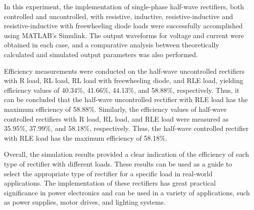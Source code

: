 \hspace{\parindent}

In this experiment, the implementation of single-phase half-wave rectifiers, both controlled and uncontrolled, with resistive, inductive, resistive-inductive and resistive-inductive with freewheeling diode loads were successfully accomplished using MATLAB's Simulink. The output waveforms for voltage and current were obtained in each case, and a comparative analysis between theoretically calculated and simulated output parameters was also performed.

Efficiency measurements were conducted on the half-wave uncontrolled rectifiers with R load, RL load, RL load with freewheeling diode, and RLE load, yielding efficiency values of
40.34\%, 41.66\%, 44.13\%, and 58.88\%, respectively.
Thus, it can be concluded that the half-wave uncontrolled rectifier with RLE load has the maximum efficiency of
58.88\%.
Similarly, the efficiency values of half-wave controlled rectifiers with R load, RL load, and RLE load were measured as
35.95\%, 37.99\%, and 58.18\%, respectively.
Thus, the half-wave controlled rectifier with RLE load has the maximum efficiency of 58.18\%.

Overall, the simulation results provided a clear indication of the efficiency of each type of rectifier with different loads. These results can be used as a guide to select the appropriate type of rectifier for a specific load in real-world applications. The implementation of these rectifiers has great practical significance in power electronics and can be used in a variety of applications, such as power supplies, motor drives, and lighting systems.
\pagebreak